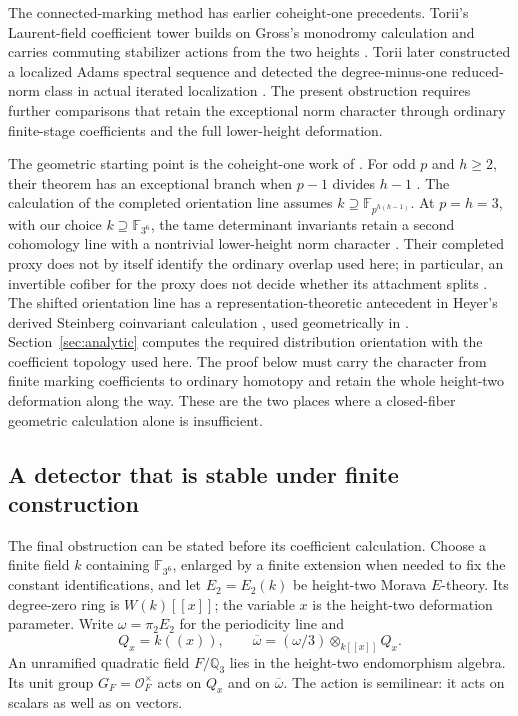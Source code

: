 The connected-marking method has earlier coheight-one precedents.
Torii's Laurent-field coefficient tower builds on Gross's monodromy
calculation and carries commuting stabilizer actions from the two heights
\citep[Theorem~3.5(1a)]{Gross79}
\citep[Theorems~2.7 and 2.9 and Corollary~2.8]{Torii03}.
Torii later constructed a localized Adams spectral sequence and detected
the degree-minus-one reduced-norm class in actual iterated localization
\citep[Theorems~4.7 and 8.1]{Torii11}. The present obstruction requires
further comparisons that retain the exceptional norm character through
ordinary finite-stage coefficients and the full lower-height deformation.

The geometric starting point is the coheight-one work of
\citet{BMR26}. For odd \(p\) and \(h\geq2\), their theorem has an
exceptional branch when \(p-1\) divides \(h-1\)
\citep[Theorem~A]{BMR26}. The calculation of the completed orientation line
assumes \(k\supseteq\mathbb F_{p^{h(h-1)}}\). At \(p=h=3\), with our choice
\(k\supseteq\mathbb F_{3^6}\), the tame determinant invariants retain a second
cohomology line with a nontrivial lower-height
norm character \citep[Theorem~D, Theorems~3.6.10 and~5.2.10, and Lemma~5.2.5]{BMR26}.
Their completed proxy does not by itself identify the
ordinary overlap used here; in particular, an invertible cofiber for the
proxy does not decide whether its attachment splits
\citep[Theorem~A and Remark~5.2.12]{BMR26}.
The shifted orientation line has a representation-theoretic antecedent in
Heyer's derived Steinberg coinvariant calculation
\citep[Corollary~5.3.4]{Heyer23}
\citep[Lemma~4.1.6 and Corollary~4.3.10]{HeyerGeo24}, used geometrically in
\citet[Sections~3.5--3.6]{BMR26}. Section~\ref{sec:analytic} computes the
required distribution orientation with the coefficient topology used here.
The proof below must carry the character from finite marking coefficients
to ordinary homotopy and retain the whole height-two deformation along the
way. These are the two places where a closed-fiber geometric calculation
alone is insufficient.

\subsection{A detector that is stable under finite construction}

The final obstruction can be stated before its coefficient calculation.
Choose a finite field \(k\) containing \(\mathbb F_{3^6}\), enlarged by a
finite extension when needed to fix the constant identifications, and let
\(E_2=E_2(k)\) be height-two Morava \(E\)-theory. Its degree-zero ring is
\(W(k)[[x]]\); the variable \(x\) is the height-two deformation parameter.
Write \(\omega=\pi_2E_2\) for the periodicity line and
\[
       Q_x=k((x)),\qquad
       \overline\omega=(\omega/3)\otimes_{k[[x]]}Q_x.
\]
An unramified quadratic field \(F/\mathbb Q_3\) lies in the height-two
endomorphism algebra. Its unit group \(G_F=\mathcal O_F^\times\) acts on
\(Q_x\) and on \(\overline\omega\). The action is semilinear: it acts on
scalars as well as on vectors.

